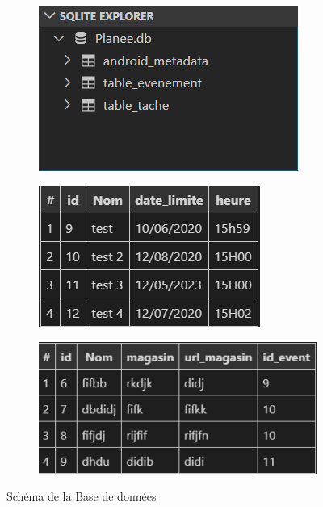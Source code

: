 \documentclass[12pt,a4paper]{report}
\begin{document}
\begin{flushleft}
\begin{figure}[!h]
    \centering
    \begin{subfigure}[b]{0.3\textwidth}
        \includegraphics[width=\textwidth]{SchemaBDD}
    \end{subfigure}
    \begin{subfigure}[b]{0.3\textwidth}
        \includegraphics[width=\textwidth]{TableEvent}
    \end{subfigure}
    \begin{subfigure}[b]{0.3\textwidth}
        \includegraphics[width=\textwidth]{TableTache}
    \end{subfigure}
    \caption{Schéma de la Base de données}
\end{figure}
\end{flushleft}
\end{document}
